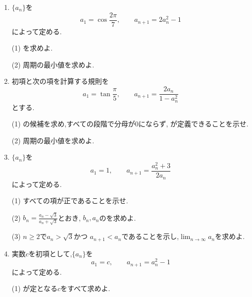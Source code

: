 \begin{enumerate}[label=\textbf{問\arabic*.},leftmargin=3.8em,format=\bookitemlink{practice-special}{problem}{hint}]
    (1) 恒等式
    \[
      \left(u+u^{-1}\right)^3
      -3\left(u+u^{-1}\right)=u^3+u^{-3}
    \]
    を示せ.ただし,$u\ne0$とする.
    \par\smallskip\noindent
    (2) を求めよ.
  \item {}$\{a_n\}$を
    \[
      a_1=\cos\frac{2\pi}{7},\qquad
      a_{n+1}=2a_n^2-1
    \]
    によって定める.
    \par\smallskip\noindent
    (1) を求めよ.
    \par\smallskip\noindent
    (2) 周期の最小値を求めよ.
  \item 初項と次の項を計算する規則を
    \[
      a_1=\tan\frac{\pi}{5},\qquad
      a_{n+1}=\frac{2a_n}{1-a_n^2}
    \]
    とする.
    \par\smallskip\noindent
    (1) の候補を求め,すべての段階で分母が$0$にならず,
    が定義できることを示せ.
    \par\smallskip\noindent
    (2) 周期の最小値を求めよ.
  \item {}$\{a_n\}$を
    \[
      a_1=1,\qquad
      a_{n+1}=\frac{a_n^2+3}{2a_n}
    \]
    によって定める.
    \par\smallskip\noindent
    (1) すべての項が正であることを示せ.
    \par\smallskip\noindent
    (2) $b_n=\frac{a_n-\sqrt3}{a_n+\sqrt3}$とおき,
    $b_n,a_n$のを求めよ.
    \par\smallskip\noindent
    (3) $n\ge2$で$a_n>\sqrt3$かつ
    $a_{n+1}<a_n$であることを示し,$\lim_{n\to\infty}a_n$を求めよ.
  \item 実数$c$を初項として,$\{a_n\}$を
    \[
      a_1=c,\qquad a_{n+1}=a_n^2-1
    \]
    によって定める.
    \par\smallskip\noindent
    (1) が定となる$c$をすべて求めよ.
    \par\smallskip\noindent

\end{enumerate}

